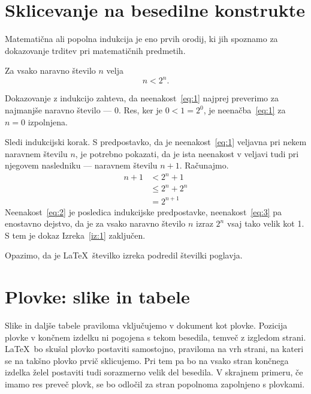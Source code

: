 \chapter{Sklicevanje na besedilne konstrukte}
\label{ch1}
Matematična ali popolna indukcija je eno prvih orodij, ki jih spoznamo za dokazovanje trditev pri matematičnih predmetih.
\begin{izrek}
\label{iz:1}
Za vsako naravno število $n$ velja
\begin{equation}
n < 2^n.
\label{eq:1}
\end{equation}
\end{izrek}
\begin{dokaz}
Dokazovanje z indukcijo zahteva, da neenakost~\eqref{eq:1} najprej preverimo za najmanjše naravno število --- $0$. Res, ker je $0 < 1 = 2^0$, je neenačba~\eqref{eq:1} za $n=0$ izpolnjena.

Sledi indukcijski korak. S predpostavko, da je neenakost~\eqref{eq:1} veljavna pri nekem naravnem številu $n$, je potrebno pokazati, da je ista neenakost v veljavi tudi pri njegovem nasledniku --- naravnem številu $n+1$. Računajmo.
\begin{align}
n+1 &< 2^n + 1  \label{eq:2}\\
    &\le 2^n + 2^n \label{eq:3}\\
    &= 2^{n+1} \nonumber
\end{align}
Neenakost~\eqref{eq:2} je posledica indukcijske predpostavke, neenakost~\eqref{eq:3} pa enostavno dejstvo, da je za vsako naravno število $n$ izraz $2^n$ vsaj tako velik kot 1. S tem je dokaz Izreka~\ref{iz:1} zaključen.
\end{dokaz}

Opazimo, da je \LaTeX\ številko izreka podredil številki poglavja.


\chapter{Plovke: slike in tabele}
\label{ch2}
Slike in daljše tabele praviloma vključujemo v dokument kot plovke. Pozicija plovke v končnem izdelku ni pogojena s tekom besedila, temveč z izgledom strani. \LaTeX\ bo skušal plovko postaviti samostojno, praviloma na vrh strani, na kateri se na takšno plovko prvič sklicujemo. Pri tem pa bo na vsako stran končnega izdelka želel postaviti tudi sorazmerno velik del besedila. V skrajnem primeru, če imamo res preveč plovk, se bo odločil za stran popolnoma zapolnjeno s plovkami.

